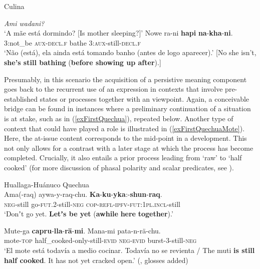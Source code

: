\begin{exe}	
	\ex Culina\label{exFirstCulina2}
		\begin{xlist}
			 \textit{Ami wadani?}\\
			\lq A mãe está dormindo? [Is mother sleeping?]\rq{}
			\gll Nowe ra-ni \textbf{hapi} \textbf{na}-\textbf{kha}-\textbf{ni}.\\
			3:not\_be \textsc{aux}-\textsc{decl}.\textsc{f} bathe 3:\textsc{aux}-still-\textsc{decl}.\textsc{f}\\
			\glt \lq Não (está), ela ainda está tomando banho (antes de logo aparecer).' [No she isn’t, \textbf{she's still bathing} (\textbf{before showing up after}).]
			\\\parencite[184]{Tiss2004}
		\end{xlist}
\end{exe}

Presumably, in this scenario the acquisition of a persistive meaning component goes back to the recurrent use of an expression in contexts that involve pre-established states or processes together with an  viewpoint. Again, a conceivable bridge can be found in instances where a preliminary continuation of a situation is at stake, such as in (\ref{exFirstQuechua}), repeated below. Another type of context that could have played a role is illustrated in (\ref{exFirstQuechuaMote}). Here, the at-issue content corresponds to the mid-point in a development. This not only allows for a contrast with a later stage at which the process has become completed. Crucially, it also entails a prior process leading from \lq raw\rq{ }to \lq half cooked\rq{ }(for more discussion of phasal polarity and scalar predicates, see ).

\begin{exe}
	 Huallaga-Huánuco Quechua\\
	\gll Ama\textup{(}-raq\textup{)} aywa-y-raq-chu. \textbf{Ka}-\textbf{ku}-\textbf{yka}:-\textbf{shun}-\textbf{raq}.\\
	\textsc{neg}-still go-\textsc{fut}.2-still-\textsc{neg} \textsc{cop}-\textsc{refl}-\textsc{ipfv}-\textsc{fut}:1\textsc{pl}.\textsc{incl}-still\\
	\glt \lq Donʼt go yet. \textbf{Letʼs be yet} (\textbf{awhile} \textbf{here} \textbf{together}).' \parencite[388]{Weber1989}

	\ex \label{exFirstQuechuaMote}
	\gll Mute-ga \textbf{capru}-\textbf{lla}-\textbf{rä}-\textbf{mi}. Mana-mi pata-n-rä-chu.\\
	mote-\textsc{top} half\_cooked-only-still-\textsc{evid} \textsc{neg}-\textsc{evid} burst-3-still-\textsc{neg}\\
	\glt \lq El mote está todavía a medio cocinar.  Todavía no se revienta / The muti \textbf{is still half cooked}. It has not yet cracked open.\rq{ }(\cite[121]{WeberEtAl2008}, glosses added)	
\end{exe}

